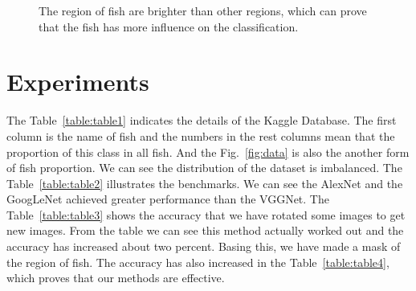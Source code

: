 \documentclass[conference]{IEEEtran}
\begin{document}
\begin{figure}[!ht]

\centering
{}
  \hspace{0.15in}
  \hspace{0.15in}
  \caption{The region of fish are brighter than other regions, which can prove that the fish has more influence on the classification.}
  \label{fig:pool}
\end{figure}






\section{Experiments}
The Table~\ref{table:table1} indicates the details of the Kaggle Database. The first column is the name of fish and the numbers in the rest columns mean that the proportion of this class in all fish. And the Fig.~\ref{fig:data} is also the another form of fish proportion. We can see the distribution of the dataset is imbalanced. The Table~\ref{table:table2} illustrates the benchmarks. We can see the AlexNet and the GoogLeNet achieved greater performance than the VGGNet. The Table~\ref{table:table3} shows the accuracy that we have rotated some images to get new images. From the table we can see this method actually worked out and the accuracy has increased about two percent. Basing this, we have made a mask of the region of fish. The accuracy has also increased in the Table~\ref{table:table4}, which proves that our methods are effective.
\end{document}
